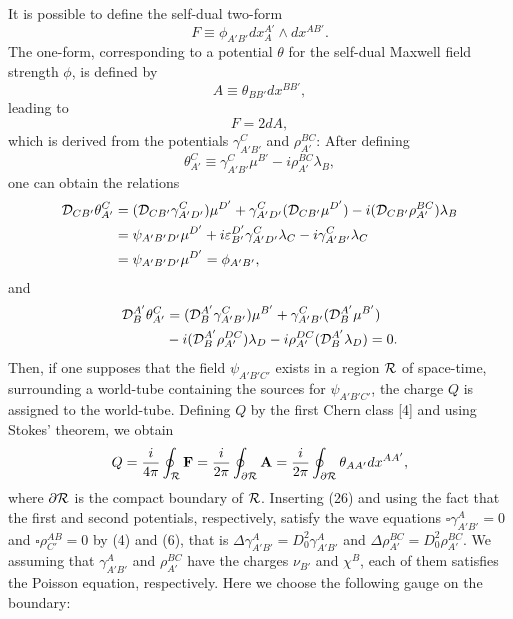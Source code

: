 \documentclass[a4paper,12pt]{article}
\begin{document}
It is possible to define the self-dual two-form
\begin{equation}
F\equiv \phi_{A'B'}dx_A^{A'}\wedge dx^{AB'}.
\end{equation}
The one-form, corresponding to a potential $\theta$ for the self-dual Maxwell field strength $\phi$, is defined by
\begin{equation}
A\equiv \theta_{BB'}dx^{BB'},
\end{equation}
leading to 
\begin{equation}F=2dA,\end{equation}
which is derived from the potentials $\gamma^C_{A'B'}$ and $\rho_{A'}^{BC}$:
After defining 
\begin{equation}
\theta^C_{A'}\equiv \gamma^C_{A'B'}\mu^{B'}-i\rho_{A'}^{BC}\lambda_B,
\end{equation}
one can obtain the relations
\begin{equation}
\begin{split}
{\cal D}_{CB'}\theta^C_{A'}&=({\cal D}_{CB'}\gamma^C_{A'D'})\mu^{D'}+\gamma^C_{A'D'}({\cal D}_{CB'}\mu^{D'})-i({\cal D}_{CB'}\rho_{A'}^{BC})\lambda_B\\
&=\psi_{A'B'D'}\mu^{D'}+i\varepsilon_{B'}^{D'}\gamma^C_{A'D'}\lambda_C-i\gamma^C_{A'B'}\lambda_C\\
&=\psi_{A'B'D'}\mu^{D'}=\phi_{A'B'},
\end{split}
\end{equation}
and
\begin{equation}
\begin{split}
{\cal D}_B^{A'}\theta^C_{A'}&=({\cal D}_B^{A'}\gamma^C_{A'B'})\mu^{B'}+\gamma^C_{A'B'}({\cal D}_B^{A'}\mu^{B'})\\
 &-i({\cal D}_B^{A'}\rho_{A'}^{DC})\lambda_D-i\rho_{A'}^{DC}({\cal D}_B^{A'}\lambda_D)=0.
 \end{split}
\end{equation}
Then, if one supposes that the field $\psi_{A'B'C'}$ exists in a region ${\cal R}$ of space-time, surrounding a world-tube containing the sources for $\psi_{A'B'C'}$, the charge $Q$ is assigned to the world-tube. Defining $Q$ by the first Chern class [4] and using Stokes' theorem, we obtain
\begin{equation}
Q=\frac{i}{4\pi}\oint_{{\cal R}}{\bf F}=\frac{i}{2\pi}\oint_{\partial{\cal R}}{\bf A}=\frac{i}{2\pi}\oint_{\partial{\cal R}}\theta_{AA'}dx^{AA'},
\end{equation}
where $\partial{\cal R}$ is the compact boundary of ${\cal R}$.
Inserting (26) and using the fact that the first and second potentials, respectively, satisfy the wave equations $\square\gamma^A_{A'B'}=0$ and $\square\rho_{C'}^{AB}=0$ by (4) and (6), that is $\Delta\gamma^A_{A'B'}=D_0^2\gamma^A_{A'B'}$ and $\Delta\rho_{A'}^{BC}=D_0^2\rho_{A'}^{BC}$. We assuming that $\gamma^A_{A'B'}$ and $\rho_{A'}^{BC}$ have the charges $\nu_{B'}$ and $\chi^B$, each of them satisfies the Poisson equation, respectively. Here we choose the following gauge on the boundary:
\end{document}
